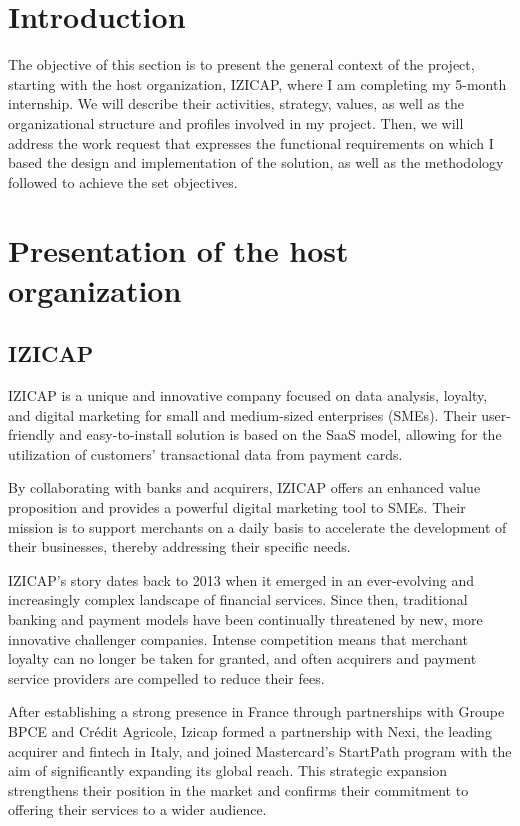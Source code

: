 \section{Introduction}
The objective of this section is to present the general context of the project, starting with the host organization, IZICAP, where I am completing my 5-month internship. We will describe their activities, strategy, values, as well as the organizational structure and profiles involved in my project. Then, we will address the work request that expresses the functional requirements on which I based the design and implementation of the solution, as well as the methodology followed to achieve the set objectives.

\section{Presentation of the host organization}
\subsection{IZICAP}
IZICAP is a unique and innovative company focused on data analysis, loyalty, and digital marketing for small and medium-sized enterprises (SMEs). Their user-friendly and easy-to-install solution is based on the SaaS model, allowing for the utilization of customers' transactional data from payment cards.

By collaborating with banks and acquirers, IZICAP offers an enhanced value proposition and provides a powerful digital marketing tool to SMEs. Their mission is to support merchants on a daily basis to accelerate the development of their businesses, thereby addressing their specific needs.

IZICAP's story dates back to 2013 when it emerged in an ever-evolving and increasingly complex landscape of financial services. Since then, traditional banking and payment models have been continually threatened by new, more innovative challenger companies. Intense competition means that merchant loyalty can no longer be taken for granted, and often acquirers and payment service providers are compelled to reduce their fees.

After establishing a strong presence in France through partnerships with Groupe BPCE and Crédit Agricole, Izicap formed a partnership with Nexi, the leading acquirer and fintech in Italy, and joined Mastercard's StartPath program with the aim of significantly expanding its global reach. This strategic expansion strengthens their position in the market and confirms their commitment to offering their services to a wider audience.

